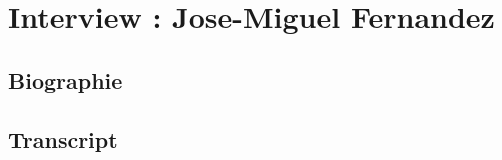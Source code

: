 \chapter{Interview : Jose-Miguel Fernandez}
\label{appendix:fernandez}

\section*{Biographie}


\section*{Transcript}
